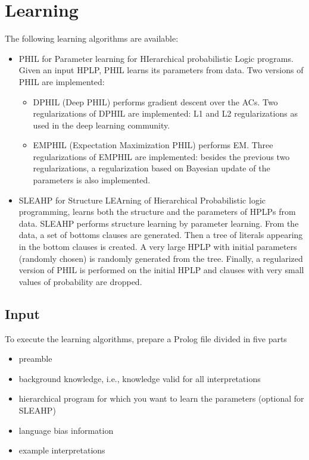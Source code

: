 \documentclass[letterpaper,10pt,english]{sphinxmanual}
\begin{document}
\chapter{Learning}
\label{\detokenize{index:learning}}
The following learning algorithms are available:
\begin{itemize}
\item {} 
PHIL for Parameter learning for HIerarchical probabilistic Logic programs. Given an input HPLP, PHIL learns its parameters from data. Two versions of PHIL are implemented:
\begin{itemize}
\item {} 
DPHIL (Deep PHIL) \label{\detokenize{index:id11}}{\hyperref[\detokenize{index:nguriglam18-plp-iw}]{\sphinxcrossref{{[}NFRL18b{]}}}} performs gradient descent over the ACs. Two regularizations of DPHIL are implemented: L1 and L2 regularizations as used in the deep learning community.

\item {} 
EMPHIL (Expectation Maximization PHIL) \label{\detokenize{index:id12}}{\hyperref[\detokenize{index:fadja2018expectation}]{\sphinxcrossref{{[}NFRL18a{]}}}} performs EM. Three regularizations of EMPHIL are implemented: besides the previous two regularizations, a regularization based on Bayesian update of the parameters is also implemented.

\end{itemize}

\item {} 
SLEAHP for Structure LEArning of Hierarchical Probabilistic logic programming, learns both the structure and the parameters of HPLPs from data. SLEAHP performs structure learning by parameter learning. From the data, a set of bottoms clauses are generated. Then a tree of literals appearing in the bottom clauses is created. A very large HPLP with initial parameters (randomly chosen) is randomly generated from the tree. Finally, a regularized version of PHIL is performed on the initial HPLP and clauses with very small values of probability are dropped.

\end{itemize}


\section{Input}
\label{\detokenize{index:input}}
To execute the learning algorithms, prepare a Prolog file divided in five parts
\begin{itemize}
\item {} 
preamble

\item {} 
background knowledge, i.e., knowledge valid for all interpretations

\item {} 
hierarchical program for which you want to learn the parameters (optional for SLEAHP)

\item {} 
language bias information

\item {} 
example interpretations

\end{itemize}
\end{document}
